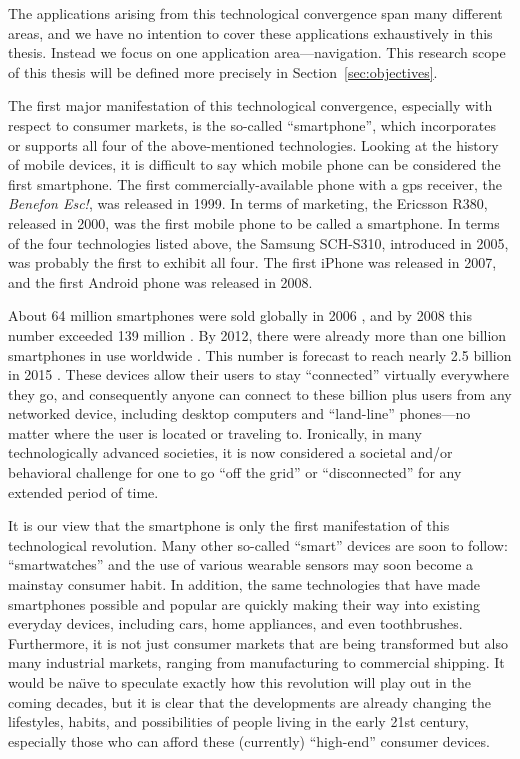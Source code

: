The applications arising from this technological convergence span many different areas, and we have no intention to cover these applications exhaustively in this thesis. Instead we focus on one application area---navigation. This research scope of this thesis will be defined more precisely in Section~\ref{sec:objectives}.

The first major manifestation of this technological convergence, especially with respect to consumer markets, is the so-called ``smartphone'', which incorporates or supports all four of the above-mentioned technologies. Looking at the history of mobile devices, it is difficult to say which mobile phone can be considered the first smartphone. The first commercially-available phone with a \gls{gps} receiver, the \emph{Benefon Esc!}, was released in 1999. In terms of marketing, the Ericsson R380, released in 2000, was the first mobile phone to be called a smartphone. In terms of the four technologies listed above, the Samsung SCH-S310, introduced in 2005, was probably the first to exhibit all four. The first iPhone was released in 2007, and the first Android phone was released in 2008.

About 64 million smartphones were sold globally in 2006 \cite{canalys_2007}, and by 2008 this number exceeded 139 million \cite{Gartner2009}. By 2012, there were already more than one billion smartphones in use worldwide \cite{Mawston2012}. This number is forecast to reach nearly 2.5 billion in 2015 \cite{KoreaTimes2014}. These devices allow their users to stay ``connected'' virtually everywhere they go, and consequently anyone can connect to these billion plus users from any networked device, including desktop computers and ``land-line'' phones---no matter where the user is located or traveling to. Ironically, in many technologically advanced societies, it is now considered a societal and/or behavioral challenge for one to go ``off the grid'' or ``disconnected'' for any extended period of time.

It is our view that the smartphone is only the first manifestation of this technological revolution. Many other so-called ``smart'' devices are soon to follow: ``smartwatches'' and the use  of various wearable sensors may soon become a mainstay consumer habit. In addition, the same technologies that have made smartphones possible and popular are quickly making their way into existing everyday devices, including cars, home appliances, and even toothbrushes. Furthermore, it is not just consumer markets that are being transformed but also many industrial markets, ranging from manufacturing to commercial shipping. It would be  na\"{\i}ve to speculate exactly how this revolution will play out in the coming decades, but it is clear that the developments are already changing the lifestyles, habits, and possibilities of people living in the early 21st century, especially those who can afford these (currently) ``high-end'' consumer devices.

